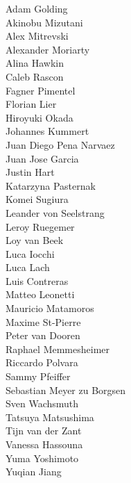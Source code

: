 \begin{center}
	\begin{minipage}{0.8\textwidth}
		\begin{multicols}{3}%
			\footnotesize
			\noindent%
			Adam Golding\\
			Akinobu Mizutani\\
			Alex Mitrevski\\
			Alexander Moriarty\\
			Alina Hawkin\\
			Caleb Rascon\\
			Fagner Pimentel\\
			Florian Lier\\
			Hiroyuki Okada\\
			Johannes Kummert\\
			Juan Diego Pena Narvaez\\
			Juan Jose Garcia\\
			Justin Hart\\
			Katarzyna Pasternak\\
			Komei Sugiura\\
			Leander von Seelstrang\\
			Leroy Ruegemer\\
			Loy van Beek\\
			Luca Iocchi\\
			Luca Lach\\
			Luis Contreras\\
			Matteo Leonetti\\
			Mauricio Matamoros\\
			Maxime St-Pierre\\
			Peter van Dooren\\
			Raphael Memmesheimer\\
			Riccardo Polvara\\
			Sammy Pfeiffer\\
			Sebastian Meyer zu Borgsen\\
			Sven Wachsmuth\\
			Tatsuya Matsushima\\
			Tijn van der Zant\\
			Vanessa Hassouna\\
			Yuma Yoshimoto\\
			Yuqian Jiang
		\end{multicols}
	\end{minipage}
\end{center}

